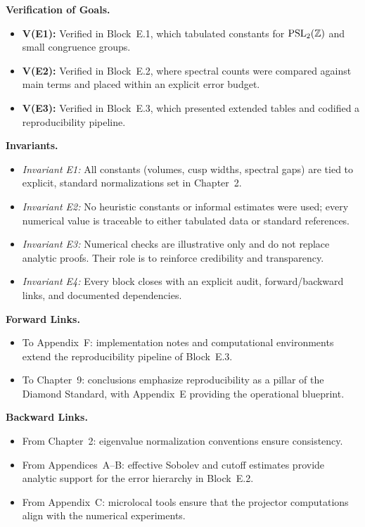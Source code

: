 \medskip
\noindent \textbf{Verification of Goals.}
\begin{itemize}
  \item \textbf{V(E1):} Verified in Block~E.1, which tabulated constants for
  $\operatorname{PSL}_2(\mathbb Z)$ and small congruence groups.  
  \item \textbf{V(E2):} Verified in Block~E.2, where spectral counts were compared
  against main terms and placed within an explicit error budget.  
  \item \textbf{V(E3):} Verified in Block~E.3, which presented extended tables
  and codified a reproducibility pipeline.  
\end{itemize}

\medskip
\noindent \textbf{Invariants.}
\begin{itemize}
  \item \emph{Invariant E1:} All constants (volumes, cusp widths, spectral gaps)
  are tied to explicit, standard normalizations set in Chapter~2.  
  \item \emph{Invariant E2:} No heuristic constants or informal estimates were used;
  every numerical value is traceable to either tabulated data or standard references.  
  \item \emph{Invariant E3:} Numerical checks are illustrative only and do not replace
  analytic proofs. Their role is to reinforce credibility and transparency.  
  \item \emph{Invariant E4:} Every block closes with an explicit audit, forward/backward
  links, and documented dependencies.  
\end{itemize}

\medskip
\noindent \textbf{Forward Links.}
\begin{itemize}
  \item To Appendix~F: implementation notes and computational environments extend
  the reproducibility pipeline of Block~E.3.  
  \item To Chapter~9: conclusions emphasize reproducibility as a pillar of the
  Diamond Standard, with Appendix~E providing the operational blueprint.  
\end{itemize}

\noindent \textbf{Backward Links.}
\begin{itemize}
  \item From Chapter~2: eigenvalue normalization conventions ensure consistency.  
  \item From Appendices~A--B: effective Sobolev and cutoff estimates provide
  analytic support for the error hierarchy in Block~E.2.  
  \item From Appendix~C: microlocal tools ensure that the projector computations
  align with the numerical experiments.  
\end{itemize}

